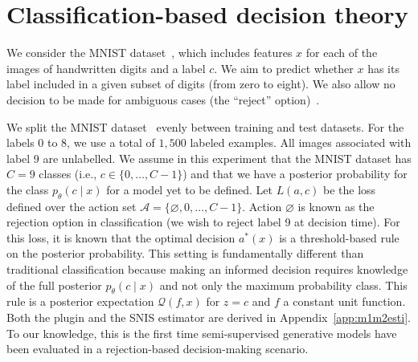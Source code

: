 \section{Classification-based decision theory}
\label{label_decision}

We consider the MNIST dataset~\cite{mnist}, which includes features $x$ for each of the images of handwritten digits and a label $c$. We aim to predict whether $x$ has its label included in a given subset of digits (from zero to eight). We also allow no decision to be made for ambiguous cases (the ``reject'' option)~\cite{Bishop:2006:PRM:1162264}.

We split the MNIST dataset~\cite{mnist} evenly between training and test datasets.
For the labels 0 to 8, we use a total of $1,500$ labeled examples. All images associated with label 9 are unlabelled. We assume in this experiment that the MNIST dataset has $C = 9$ classes (i.e., $c \in \{0, \ldots, C-1\}$) 
and that we have a posterior probability for the class $p_\theta(c \mid x)$ for a model yet to be defined. Let $L(a, c)$ be the loss defined over the action set $\mathcal{A} = \{\varnothing, 0, \ldots, C-1\}$. Action $\varnothing$ is known as the rejection option in classification (we wish to reject label 9 at decision time). For this loss, it is known that the optimal decision $a^*(x)$ is a threshold-based rule~\cite{Bishop:2006:PRM:1162264} on the posterior probability. This setting is fundamentally different than traditional classification because making an informed decision requires knowledge of the full posterior $p_\theta(c \mid x)$ and not only the maximum probability class. This rule is a posterior expectation $\mathcal{Q}(f, x)$ for $z = c$ and $f$ a constant unit function. Both the plugin and the SNIS estimator are derived in Appendix~\ref{app:m1m2esti}. To our knowledge, this is the first time semi-supervised generative models have been evaluated in a rejection-based decision-making scenario. 

